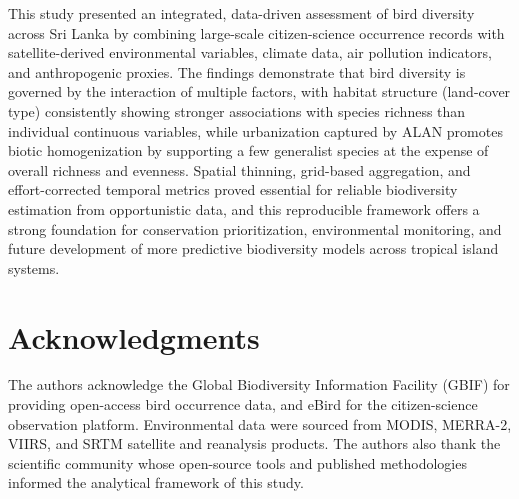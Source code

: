 \documentclass[conference]{IEEEtran}
\begin{document}
This study presented an integrated, data-driven assessment of bird diversity across Sri Lanka by combining large-scale citizen-science occurrence records with satellite-derived environmental variables, climate data, air pollution indicators, and anthropogenic proxies. The findings demonstrate that bird diversity is governed by the interaction of multiple factors, with habitat structure (land-cover type) consistently showing stronger associations with species richness than individual continuous variables, while urbanization captured by ALAN promotes biotic homogenization by supporting a few generalist species at the expense of overall richness and evenness. Spatial thinning, grid-based aggregation, and effort-corrected temporal metrics proved essential for reliable biodiversity estimation from opportunistic data, and this reproducible framework offers a strong foundation for conservation prioritization, environmental monitoring, and future development of more predictive biodiversity models across tropical island systems.

\section{Acknowledgments}
The authors acknowledge the Global Biodiversity Information Facility (GBIF) for providing open-access bird occurrence data, and eBird for the citizen-science observation platform. Environmental data were sourced from MODIS, MERRA-2, VIIRS, and SRTM satellite and reanalysis products. The authors also thank the scientific community whose open-source tools and published methodologies informed the analytical framework of this study.

{\footnotesize


}
\end{document}

